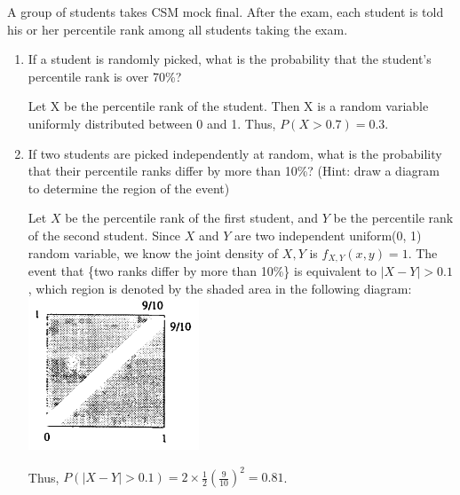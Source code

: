 \question A group of students takes CSM mock final. After the exam, each student is told his or her percentile rank among all students taking the exam. 

\begin{enumerate}[label=(\alph*)] 
\item If a student is randomly picked, what is the probability that the student's percentile rank is over 70\%? 
\begin{solution}[.5cm] 
Let X be the percentile rank of the student. Then X is a random variable uniformly distributed between 0 and 1. Thus, $P(X > 0.7) = 0.3$. 
\end{solution}

\item If two students are picked independently at random, what is the probability that their percentile ranks differ by more than 10\%? (Hint: draw a diagram to determine the region of the event) 
\begin{solution}[1.75cm]
Let $X$ be the percentile rank of the first student, and $Y$ be the percentile rank of the second student. Since $X$ and $Y$ are two independent uniform(0, 1) random variable, we know the joint density of $X, Y$ is $f_{X, Y} (x, y) = 1$. The event that \{two ranks differ by more than 10\%\} is equivalent to $|X - Y| > 0.1$, which region is denoted by the shaded area in the following diagram: \\ 

\includegraphics[width=2in]{density.png} 

Thus, $P(|X - Y| > 0.1) = 2 \times \frac{1}{2} (\frac{9}{10})^ 2 = 0.81$. 

\end{solution}
\end{enumerate}
